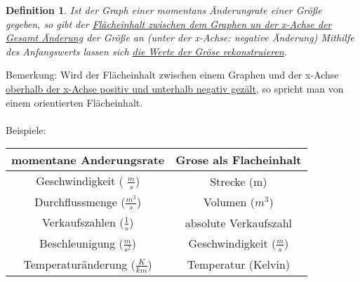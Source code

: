 \documentclass{article}
\newtheorem{definition}{Definition}
\begin{document}
\begin{definition}Ist der Graph einer momentans Änderungrate einer Größe gegeben, so gibt der \underline{Flächeinhalt zwischen dem Graphen un der x-Achse der Gesamt Änderung} der Größe an (unter der x-Achse: negative Änderung)
Mithilfe des Anfangswerts lassen sich \underline{die Werte der Gröse rekonstruieren}.
\end{definition}
Bemerkung:
Wird der Flächeinhalt zwischen einem Graphen und der x-Achse \underline{oberhalb der x-Achse positiv und unterhalb negativ gezält}, so spricht man von  einem orientierten Flächeinhalt.
\\
\\
Beispiele:
\begin{center}
\begin{tabular}{ c | c }
momentane Anderungsrate & Grose als Flacheinhalt \\
\hline \hline
Geschwindigkeit ( $\frac ms$) & Strecke (m) \\
Durchflussmenge ($\frac {m^3}s$) & Volumen ($m^3$) \\
Verkaufszahlen ($\frac 1s$) & absolute Verkaufszahl\\
Beschleunigung ($\frac m{s^2}$) & Geschwindigkeit ($\frac ms$)\\
Temperaturänderung ($\frac K {km}$) & Temperatur (Kelvin) \\
\end{tabular}
\end{center}
\end{document}
